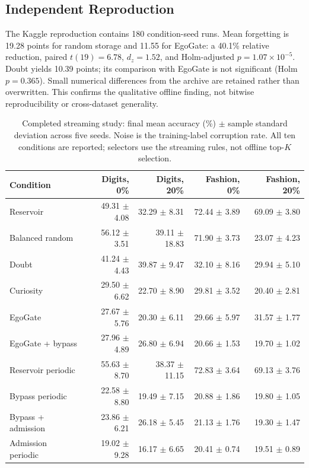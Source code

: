 \documentclass[conference]{IEEEtran}
\begin{document}
\subsection{Independent Reproduction}
The Kaggle reproduction contains 180 condition-seed runs. Mean forgetting is 19.28 points for random storage and 11.55 for EgoGate: a 40.1\% relative reduction, paired $t(19)=6.78$, $d_z=1.52$, and Holm-adjusted $p=1.07\times10^{-5}$. Doubt yields 10.39 points; its comparison with EgoGate is not significant (Holm $p=0.365$). Small numerical differences from the archive are retained rather than overwritten. This confirms the qualitative offline finding, not bitwise reproducibility or cross-dataset generality.

\begin{table}[t]
\caption{Completed streaming study: final mean accuracy (\%) $\pm$ sample standard deviation across five seeds. Noise is the training-label corruption rate. All ten conditions are reported; selectors use the streaming rules, not offline top-$K$ selection.}
\label{tab:stream}\centering\small
\begin{tabular}{lrrrr}\toprule
Condition & Digits, 0\% & Digits, 20\% & Fashion, 0\% & Fashion, 20\%\\\midrule
Reservoir & 49.31 $\pm$ 4.08 & 32.29 $\pm$ 8.31 & 72.44 $\pm$ 3.89 & 69.09 $\pm$ 3.80 \\
Balanced random & 56.12 $\pm$ 3.51 & 39.11 $\pm$ 18.83 & 71.90 $\pm$ 3.73 & 23.07 $\pm$ 4.23 \\
Doubt & 41.24 $\pm$ 4.43 & 39.87 $\pm$ 9.47 & 32.10 $\pm$ 8.16 & 29.94 $\pm$ 5.10 \\
Curiosity & 29.50 $\pm$ 6.62 & 22.70 $\pm$ 8.90 & 29.81 $\pm$ 3.52 & 20.40 $\pm$ 2.81 \\
EgoGate & 27.67 $\pm$ 5.76 & 20.30 $\pm$ 6.11 & 29.66 $\pm$ 5.97 & 31.57 $\pm$ 1.77 \\
EgoGate + bypass & 27.96 $\pm$ 4.89 & 26.80 $\pm$ 6.94 & 20.66 $\pm$ 1.53 & 19.70 $\pm$ 1.02 \\
Reservoir periodic & 55.63 $\pm$ 8.70 & 38.37 $\pm$ 11.15 & 72.83 $\pm$ 3.64 & 69.13 $\pm$ 3.76 \\
Bypass periodic & 22.58 $\pm$ 8.80 & 19.49 $\pm$ 7.15 & 20.88 $\pm$ 1.86 & 19.80 $\pm$ 1.05 \\
Bypass + admission & 23.86 $\pm$ 6.21 & 26.18 $\pm$ 5.45 & 21.13 $\pm$ 1.76 & 19.30 $\pm$ 1.47 \\
Admission periodic & 19.02 $\pm$ 9.28 & 16.17 $\pm$ 6.65 & 20.41 $\pm$ 0.74 & 19.51 $\pm$ 0.89 \\
\bottomrule\end{tabular}
\end{table}
\end{document}
